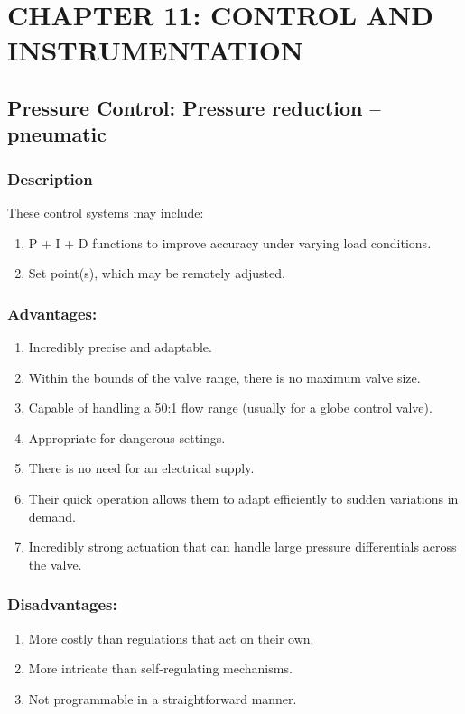 \section{CHAPTER 11: CONTROL AND INSTRUMENTATION}

\subsection{Pressure Control: Pressure reduction -- pneumatic}

\subsubsection{Description}

These control systems may include:

\begin{enumerate}
\item
  P + I + D functions to improve accuracy under varying load conditions.
\item
  Set point(s), which may be remotely adjusted.
\end{enumerate}

\subsubsection{Advantages:}

\begin{enumerate}
\item
  Incredibly precise and adaptable.
\item
  Within the bounds of the valve range, there is no maximum valve size.
\item
  Capable of handling a 50:1 flow range (usually for a globe control
  valve).
\item
  Appropriate for dangerous settings.
\item
  There is no need for an electrical supply.
\item
  Their quick operation allows them to adapt efficiently to sudden
  variations in demand.
\item
  Incredibly strong actuation that can handle large pressure
  differentials across the valve.
\end{enumerate}

\subsubsection{Disadvantages:}

\begin{enumerate}
\item
  More costly than regulations that act on their own.
\item
  More intricate than self-regulating mechanisms.
\item
  Not programmable in a straightforward manner.
\end{enumerate}

